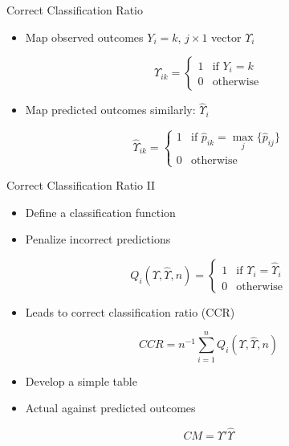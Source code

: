 \documentclass[
  ignorenonframetext,
]{beamer}
\providecommand{\tightlist}{%
  \setlength{\itemsep}{0pt}\setlength{\parskip}{0pt}}
\begin{document}
\begin{frame}{Correct Classification Ratio}
\protect{}\label{correct-classification-ratio}
\begin{itemize}
\tightlist
\item
  Map observed outcomes \(Y_i=k\), \(j \times 1\) vector \(\Upsilon_i\)
\end{itemize}

\[
\Upsilon_{ik} = \begin{cases}
 1 & \text{if } Y_i=k \\
 0 & \text{otherwise}
\end{cases}
\]

\begin{itemize}
\tightlist
\item
  Map predicted outcomes similarly: \(\hat{\Upsilon}_i\)
\end{itemize}

\[
\hat{\Upsilon}_{ik} = \begin{cases}
 1 & \text{if } \widehat{p}_{ik} = \max_j \{\widehat{p}_{ij} \} \\
 0 & \text{otherwise}
\end{cases}
\]
\end{frame}

\begin{frame}{Correct Classification Ratio II}
\protect{}\label{correct-classification-ratio-ii}
\begin{itemize}
\tightlist
\item
  Define a classification function
\item
  Penalize incorrect predictions
\end{itemize}

\[
Q_i(\Upsilon,\hat{\Upsilon},n) = \begin{cases}
 1 & \text{if } \Upsilon_i = \hat{\Upsilon}_i \\
 0 & \text{otherwise}
\end{cases}
\]

\begin{itemize}
\tightlist
\item
  Leads to correct classification ratio (CCR)
\end{itemize}

\[
CCR = n^{-1} \sum_{i=1}^n Q_i(\Upsilon,\hat{\Upsilon},n) 
\]

\begin{itemize}
\tightlist
\item
  Develop a simple table
\item
  Actual against predicted outcomes
\end{itemize}

\[
CM = \Upsilon' \hat{\Upsilon}
\]
\end{frame}
\end{document}
